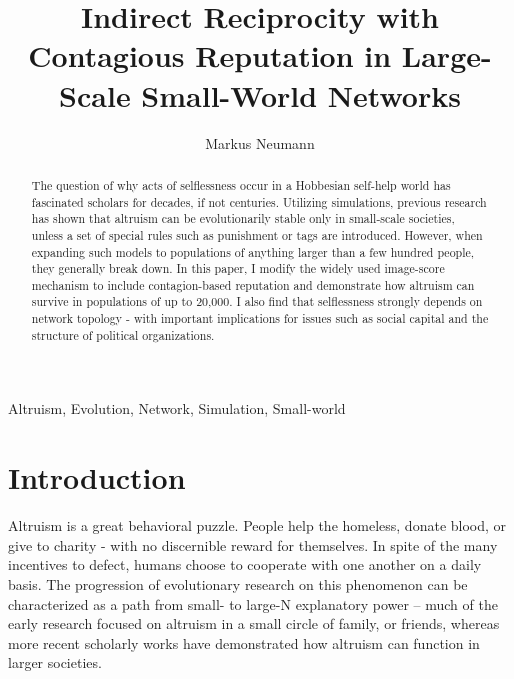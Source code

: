 \documentclass{JASSS}
\title{Indirect Reciprocity with Contagious Reputation in Large-Scale Small-World Networks}
\author[1]{Markus Neumann}
\affil[1]{Department of Political Science, The Pennsylvania State University, University Park, PA 16802, USA.}
\begin{document}
\maketitle 



\begin{abstract}
The question of why acts of selflessness occur in a Hobbesian self-help world has fascinated scholars for decades, if not centuries. Utilizing simulations, previous research has shown that altruism can be evolutionarily stable only in small-scale societies, unless a set of special rules such as punishment or tags are introduced. However, when expanding such models to populations of anything larger than a few hundred people, they generally break down. In this paper, I modify the widely used image-score mechanism to include contagion-based reputation and demonstrate how altruism can survive in populations of up to 20,000. I also find that selflessness strongly depends on network topology - with important implications for issues such as social capital and the structure of political organizations.
\end{abstract}

\begin{keywords}
Altruism, Evolution, Network, Simulation, Small-world
\end{keywords}

\parano{}



\section{Introduction}
Altruism is a great behavioral puzzle. People help the homeless, donate blood, or give to charity - with no discernible reward for themselves. In spite of the many incentives to defect, humans choose to cooperate with one another on a daily basis. The progression of evolutionary research on this phenomenon can be characterized as a path from small- to large-N explanatory power -- much of the early research focused on altruism in a small circle of family, or friends, whereas more recent scholarly works have demonstrated how altruism can function in larger societies.
\end{document}

